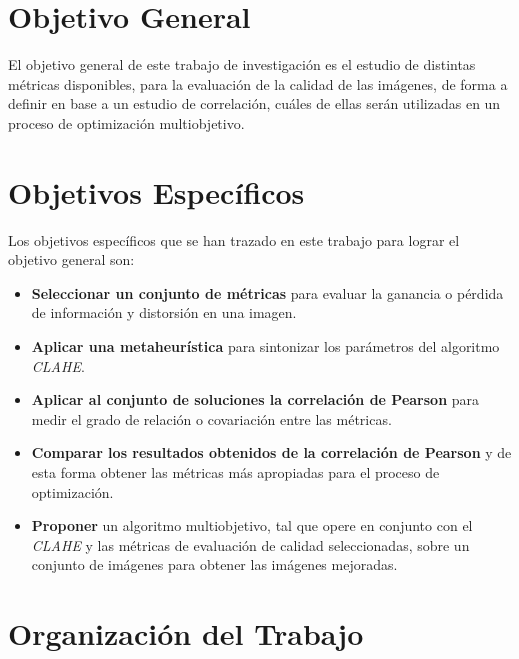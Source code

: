 \section{Objetivo General}
El objetivo general de este trabajo de investigación es el estudio de distintas métricas disponibles, para la evaluación de la calidad de las imágenes, de forma a definir en base a un estudio de correlación, cuáles de ellas serán utilizadas en un proceso de optimización multiobjetivo.


\section{Objetivos Específicos}

Los objetivos específicos que se han trazado en este trabajo para lograr el objetivo general son:
\begin{itemize}
    \item \textbf{Seleccionar un conjunto de métricas} para evaluar la ganancia o pérdida de información y distorsión en una imagen.
    \item \textbf{Aplicar una metaheurística} para sintonizar los parámetros del algoritmo \textit{CLAHE}.
    \item \textbf{Aplicar al conjunto de soluciones la correlación de Pearson} para medir el grado de relación o covariación entre las métricas.
    \item \textbf{Comparar los resultados obtenidos de la correlación de Pearson} y de esta forma obtener las métricas más apropiadas para el proceso de optimización.
    \item \textbf{Proponer} un algoritmo multiobjetivo, tal que opere en conjunto con el \textit{CLAHE} y las métricas de evaluación de calidad seleccionadas, sobre un conjunto de imágenes para obtener las imágenes mejoradas.
\end{itemize}


\section{Organización del Trabajo}

